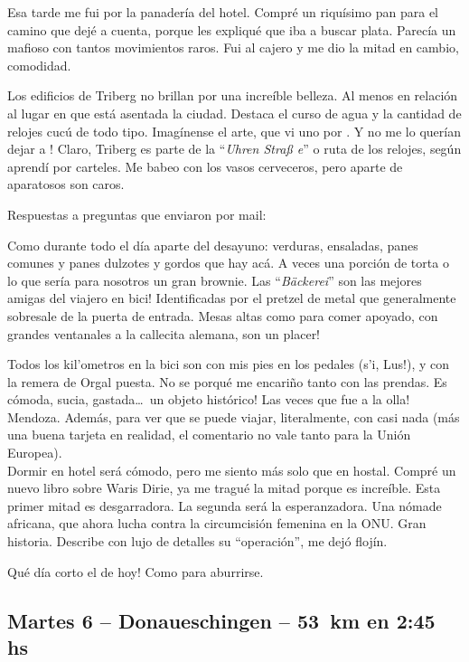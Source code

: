 Esa tarde me fui por la panader\'ia del hotel. Compr\'e un riqu\'isimo pan
para el camino que dej\'e a cuenta, porque les expliqu\'e que iba a buscar
plata. Parec\'ia un mafioso con tantos movimientos raros. Fui al cajero y me
dio la mitad en cambio, comodidad.

Los edificios de Triberg no brillan por una incre\'ible belleza. Al menos en
relaci\'on al lugar en que est\'a asentada la ciudad. Destaca el curso de agua
y la cantidad de relojes cuc\'u de todo tipo. Imag\'inense el arte, que vi uno
por . \textexclamdown Y no me lo quer\'ian dejar a
! Claro, Triberg es parte de la ``\emph{Uhren Stra\ss
e}'' o ruta de los relojes, seg\'un aprend\'i por carteles. Me babeo con los
vasos cerveceros, pero aparte de aparatosos son caros.

Respuestas a preguntas que enviaron por mail:

Como durante todo el d\'ia aparte del desayuno: verduras, ensaladas, panes
comunes y panes dulzotes y gordos que hay ac\'a. A veces una porci\'on de torta
o lo que ser\'ia para nosotros un gran brownie. \textexclamdown Las
``\emph{B\"ackerei}'' son las mejores amigas del viajero en bici! Identificadas
por el pretzel de metal que generalmente sobresale de la puerta de entrada.
Mesas altas como para comer apoyado, con grandes ventanales a la callecita
alemana, \textexclamdown son un placer!

Todos los kil'ometros en la bici son con mis pies en los pedales
(\textexclamdown s'i, Lus!), y con la remera de Orgal puesta. No se porqu\'e me
encari\~no tanto con las prendas. Es c\'omoda, sucia, gastada\ldots\
\textexclamdown un objeto hist\'orico! \textexclamdown Las veces que fue a la
olla! Mendoza. Adem\'as, para ver que se puede viajar, literalmente, con casi
nada (m\'as una buena tarjeta en realidad, el comentario no vale tanto para la
Uni\'on Europea).\\

Dormir en hotel ser\'a c\'omodo, pero me siento m\'as solo que en hostal.
Compr\'e un nuevo libro sobre Waris Dirie, ya me tragu\'e la mitad porque es
incre\'ible. Esta primer mitad es desgarradora. La segunda ser\'a la
esperanzadora. Una n\'omade africana, que ahora lucha contra la circumcisi\'on
femenina en la {\small ONU}. Gran historia. Describe con lujo de detalles su
``operaci\'on'', me dej\'o floj\'in.

\textexclamdown Qu\'e d\'ia corto el de hoy! Como para aburrirse.

\subsection*{Martes 6 -- Donaueschingen -- 53~km en 2:45 hs}

